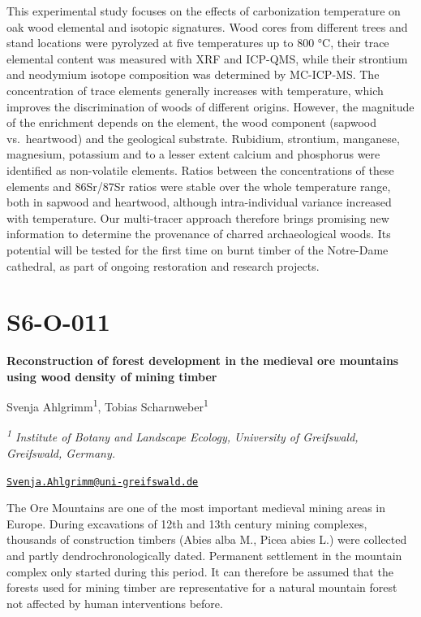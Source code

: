 \documentclass[
]{book}
\begin{document}
This experimental study focuses on the effects of carbonization temperature on oak wood elemental and isotopic signatures. Wood cores from different trees and stand locations were pyrolyzed at five temperatures up to 800 °C, their trace elemental content was measured with XRF and ICP-QMS, while their strontium and neodymium isotope composition was determined by MC-ICP-MS. The concentration of trace elements generally increases with temperature, which improves the discrimination of woods of different origins. However, the magnitude of the enrichment depends on the element, the wood component (sapwood vs.~heartwood) and the geological substrate. Rubidium, strontium, manganese, magnesium, potassium and to a lesser extent calcium and phosphorus were identified as non-volatile elements. Ratios between the concentrations of these elements and 86Sr/87Sr ratios were stable over the whole temperature range, both in sapwood and heartwood, although intra-individual variance increased with temperature. Our multi-tracer approach therefore brings promising new information to determine the provenance of charred archaeological woods. Its potential will be tested for the first time on burnt timber of the Notre-Dame cathedral, as part of ongoing restoration and research projects.

\hypertarget{s6-o-011}{%
\section*{S6-O-011}\label{s6-o-011}}

\textbf{Reconstruction of forest development in the medieval ore mountains using wood density of mining timber}

Svenja Ahlgrimm\textsuperscript{1}, Tobias Scharnweber\textsuperscript{1}

\emph{\textsuperscript{1} Institute of Botany and Landscape Ecology, University of Greifswald, Greifswald, Germany.}

\href{mailto:Svenja.Ahlgrimm@uni-greifswald.de}{\nolinkurl{Svenja.Ahlgrimm@uni-greifswald.de}}

The Ore Mountains are one of the most important medieval mining areas in Europe. During excavations of 12th and 13th century mining complexes, thousands of construction timbers (Abies alba M., Picea abies L.) were collected and partly dendrochronologically dated. Permanent settlement in the mountain complex only started during this period. It can therefore be assumed that the forests used for mining timber are representative for a natural mountain forest not affected by human interventions before.
\end{document}
